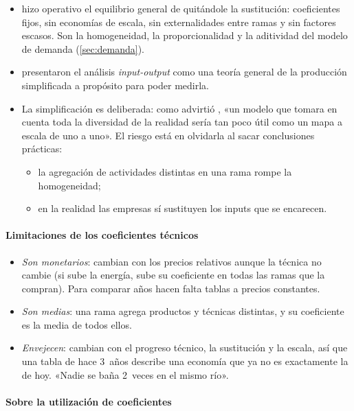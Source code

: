 \documentclass[11pt]{article}
\begin{document}
\begin{itemize}
\item {} hizo operativo el equilibrio general de  quitándole la sustitución: coeficientes fijos, sin economías de escala, sin externalidades entre ramas y sin factores escasos. Son la homogeneidad, la proporcionalidad y la aditividad del modelo de demanda (\ref{sec:demanda}).
\item \textcite{CheneryClark1959} presentaron el análisis \emph{input-output} como una teoría general de la producción simplificada a propósito para poder medirla.
\item La simplificación es deliberada: como advirtió , «un modelo que tomara en cuenta toda la diversidad de la realidad sería tan poco útil como un mapa a escala de uno a uno»\nocite{Robinson1962Essays}. El riesgo está en olvidarla al sacar conclusiones prácticas:
  \begin{itemize}
  \item la agregación de actividades distintas en una rama rompe la homogeneidad;
  \item en la realidad las empresas sí sustituyen los inputs que se encarecen.
  \end{itemize}
\end{itemize}

\paragraph{Limitaciones de los coeficientes técnicos}

\begin{itemize}
\item \emph{Son monetarios}: cambian con los precios relativos aunque la técnica no cambie (si sube la energía, sube su coeficiente en todas las ramas que la compran). Para comparar años hacen falta tablas a precios constantes.
\item \emph{Son medias}: una rama agrega productos y técnicas distintas, y su coeficiente es la media de todos ellos.
\item \emph{Envejecen}: cambian con el progreso técnico, la sustitución y la escala, así que una tabla de hace 3~años describe una economía que ya no es exactamente la de hoy. «Nadie se baña 2~veces en el mismo río».
\end{itemize}

\paragraph{Sobre la utilización de coeficientes}
\end{document}
